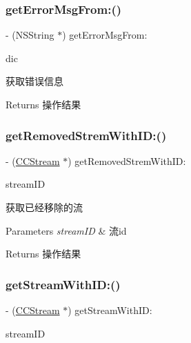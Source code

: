\subsubsection{\texorpdfstring{get\+Error\+Msg\+From\+:()}{getErrorMsgFrom:()}}
{\footnotesize\ttfamily -\/ (N\+S\+String $\ast$) get\+Error\+Msg\+From\+: \begin{DoxyParamCaption}\item[{(N\+S\+Dictionary $\ast$)}]{dic }\end{DoxyParamCaption}}

获取错误信息 \begin{DoxyReturn}{Returns}
操作结果 
\end{DoxyReturn}
\mbox{\label{interface_c_c_speaker_abae7fec416e47da8468342b66a587da9}} 
\subsubsection{\texorpdfstring{get\+Removed\+Strem\+With\+I\+D\+:()}{getRemovedStremWithID:()}}
{\footnotesize\ttfamily -\/ (\hyperlink{interface_c_c_stream}{C\+C\+Stream} $\ast$) get\+Removed\+Strem\+With\+I\+D\+: \begin{DoxyParamCaption}\item[{(N\+S\+String $\ast$)}]{stream\+ID }\end{DoxyParamCaption}}

获取已经移除的流 
\begin{DoxyParams}{Parameters}
{\em stream\+ID} & 流id \\
\hline
\end{DoxyParams}
\begin{DoxyReturn}{Returns}
操作结果 
\end{DoxyReturn}
\mbox{\label{interface_c_c_speaker_afaaf11a11080fff3ce0157ba4ab2d904}} 
\subsubsection{\texorpdfstring{get\+Stream\+With\+I\+D\+:()}{getStreamWithID:()}}
{\footnotesize\ttfamily -\/ (\hyperlink{interface_c_c_stream}{C\+C\+Stream} $\ast$) get\+Stream\+With\+I\+D\+: \begin{DoxyParamCaption}\item[{(N\+S\+String $\ast$)}]{stream\+ID }\end{DoxyParamCaption}}

